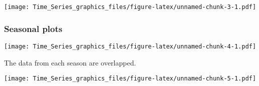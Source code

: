 \documentclass[]{article}
\newenvironment{Shaded}{\begin{snugshade}}{\end{snugshade}}
\newcommand{\DataTypeTok}[1]{\textcolor[rgb]{0.13,0.29,0.53}{#1}}
\newcommand{\KeywordTok}[1]{\textcolor[rgb]{0.13,0.29,0.53}{\textbf{#1}}}
\newcommand{\NormalTok}[1]{#1}
\newcommand{\OperatorTok}[1]{\textcolor[rgb]{0.81,0.36,0.00}{\textbf{#1}}}
\newcommand{\OtherTok}[1]{\textcolor[rgb]{0.56,0.35,0.01}{#1}}
\newcommand{\StringTok}[1]{\textcolor[rgb]{0.31,0.60,0.02}{#1}}
\begin{document}
\texttt{[image: Time\_Series\_graphics\_files/figure-latex/unnamed-chunk-3-1.pdf]}

\hypertarget{seasonal-plots}{%
\subsubsection{Seasonal plots}\label{seasonal-plots}}

\begin{Shaded}
\end{Shaded}

\texttt{[image: Time\_Series\_graphics\_files/figure-latex/unnamed-chunk-4-1.pdf]}

The data from each season are overlapped.

\begin{Shaded}
\end{Shaded}

\texttt{[image: Time\_Series\_graphics\_files/figure-latex/unnamed-chunk-5-1.pdf]}
\end{document}
